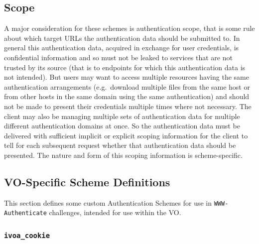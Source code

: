 \documentclass[11pt,a4paper]{ivoa}
\newcommand{\header}[1]{{\tt #1}}
\begin{document}


\subsection{Scope}\label{sec:scope}

A major consideration for these schemes is authentication scope,
that is some rule about which target URLs the authentication data
should be submitted to.
In general this authentication data,
acquired in exchange for user credentials,
is confidential information and so must not be leaked to services
that are not trusted by its source
(that is to endpoints for which this authentication data is
not intended).
But users may want to access multiple resources
having the same authentication arrangements
(e.g.\ download multiple files from the same host or from
other hosts in the same domain using the same authentication)
and should not be made to present their credentials
multiple times where not necessary.
The client may also be managing multiple sets of authentication data
for multiple different authentication domains at once.
So the authentication data must be delivered with sufficient
implicit or explicit scoping
information for the client to tell for each subsequent request
whether that authentication data should be presented.
The nature and form of this scoping information is scheme-specific.



\subsection{VO-Specific Scheme Definitions}\label{sec:voschemes}

This section defines some custom Authentication Schemes
for use in \header{WWW-Authenticate} challenges,
intended for use within the VO.

\subsubsection{\mbox{\tt ivoa\_cookie}}\label{sec:ivoa-cookie}
\end{document}
